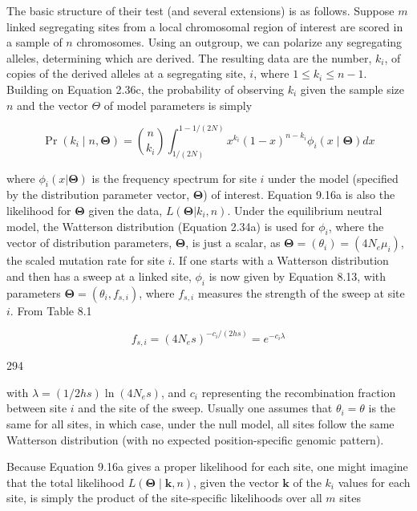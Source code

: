 \documentclass{article}
\begin{document}
The basic structure of their test (and several extensions) is as follows. Suppose $m$ linked segregating sites from a local chromosomal region of interest are scored in a sample of $n$ chromosomes. Using an outgroup, we can polarize any segregating alleles, determining which are derived. The resulting data are the number, $k_i$, of copies of the derived alleles at a segregating site, $i$, where $1 \leq k_i \leq n - 1$. Building on Equation 2.36c, the probability of observing $k_i$ given the sample size $n$ and the vector $\Theta$ of model parameters is simply

\begin{equation}
\Pr(k_{i}\mid n,\boldsymbol{\Theta})=\binom{n}{k_{i}}\int_{1/(2N)}^{1-1/(2N)}x^{k_{i}}(1-x)^{n-k_{i}}\phi_{i}(x\mid\boldsymbol{\Theta})dx
\tag{9.16a}
\label{eq:9_16a}
\end{equation}

where  $ \phi_i(x | \boldsymbol{\Theta}) $ is the frequency spectrum for site  $ i $ under the model (specified by the distribution parameter vector,  $ \boldsymbol{\Theta} $) of interest. Equation 9.16a is also the likelihood for  $ \boldsymbol{\Theta} $ given the data,  $ L(\boldsymbol{\Theta} | k_i, n) $. Under the equilibrium neutral model, the Watterson distribution (Equation 2.34a) is used for  $ \phi_i $, where the vector of distribution parameters,  $ \boldsymbol{\Theta} $, is just a scalar, as  $ \boldsymbol{\Theta} = (\theta_i) = (4N_e \mu_i) $, the scaled mutation rate for site  $ i $. If one starts with a Watterson distribution and then has a sweep at a linked site,  $ \phi_i $ is now given by Equation 8.13, with parameters  $ \boldsymbol{\Theta} = (\theta_i, f_{s,i}) $, where  $ f_{s,i} $ measures the strength of the sweep at site  $ i $. From Table 8.1

\begin{equation}
f_{s,i}=(4N_{e}s)^{-c_{i}/(2h s)}=e^{-c_{i}\lambda}
\tag{9.16b}
\label{eq:9_16b}
\end{equation}

294

with  $ \lambda = (1/2hs) \ln(4N_e s) $, and  $ c_i $ representing the recombination fraction between site  $ i $ and the site of the sweep. Usually one assumes that  $ \theta_i = \theta $ is the same for all sites, in which case, under the null model, all sites follow the same Watterson distribution (with no expected position-specific genomic pattern).

Because Equation 9.16a gives a proper likelihood for each site, one might imagine that the total likelihood  $ L(\boldsymbol{\Theta} \mid \mathbf{k}, n) $, given the vector  $ \mathbf{k} $ of the  $ k_i $ values for each site, is simply the product of the site-specific likelihoods over all  $ m $ sites
\end{document}
